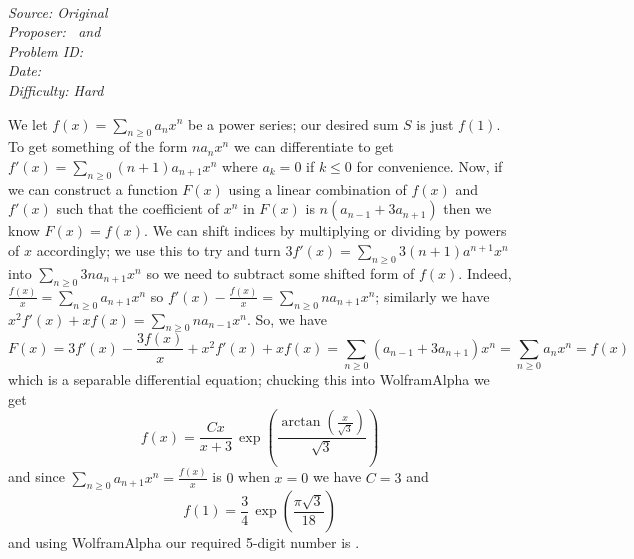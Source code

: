\SSbreak\\
\emph{Source: Original}\\
\emph{Proposer: \Ptan\, and \Pwen}\\
\emph{Problem ID:}\\
\emph{Date: }\\
\emph{Difficulty: Hard}\\
\SSbreak

\bigskip

\begin{solution}\hfil\medskip
  
    We let $f(x) = \sum_{n \geq 0} a_nx^n$ be a power series; our desired sum $S$ is just $f(1)$. To get something of the form $na_nx^n$ we can differentiate to get
    $f'(x) = \sum_{n \geq 0} (n + 1)a_{n + 1}x^n$ where $a_k = 0$ if $k \leq 0$ for convenience. Now, if we can construct a function $F(x)$ using a linear combination
    of $f(x)$ and $f'(x)$ such that the coefficient of $x^n$ in $F(x)$ is $n\left(a_{n - 1} + 3a_{n + 1}\right)$ then we know $F(x) = f(x)$. 
    We can shift indices by multiplying or dividing by powers of $x$ accordingly; we use this to try and turn $3f'(x) = \sum_{n \geq 0} 3(n + 1)a^{n + 1}x^n$ into 
    $\sum_{n \geq 0} 3na_{n + 1}x^n$ so we need to subtract some shifted form of $f(x)$. Indeed, $\frac{f(x)}{x} = \sum_{n \geq 0} a_{n + 1}x^n$ so 
    $f'(x) - \frac{f(x)}{x} = \sum_{n \geq 0} na_{n + 1}x^n$; similarly we have $x^2f'(x) + xf(x) = \sum_{n \geq 0} na_{n - 1}x^n$. 
    So, we have $$F(x) = 3f'(x) - \frac{3f(x)}{x} + x^2f'(x) + xf(x) = \sum_{n \geq 0}\left(a_{n - 1} + 3a_{n + 1}\right)x^n = \sum_{n \geq 0} a_nx^n = f(x)$$
    which is a separable differential equation; chucking this into WolframAlpha we get $$f(x) = \dfrac{Cx}{x + 3}\,\exp\left(\dfrac{\arctan\left(\frac{x}{\sqrt 3}\right)}{\sqrt 3}\right)$$
    and since $\sum_{n \geq 0} a_{n + 1}x^n = \frac{f(x)}{x}$ is $0$ when $x = 0$ we have $C = 3$ and 
    $$f(1) = \dfrac{3}{4}\, \exp\left(\dfrac{\pi \sqrt 3}{18}\right)$$ and using WolframAlpha our required 5-digit number is .
\end{solution}\bigskip
